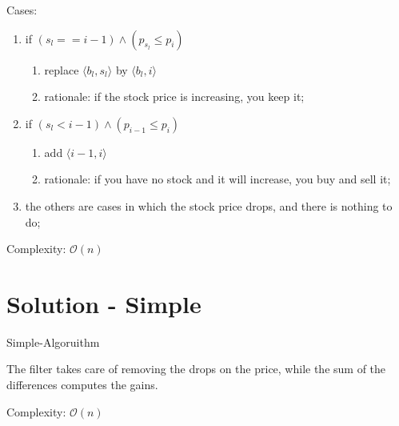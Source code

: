 Cases:

\begin{enumerate}
    \item if $(s_l == i-1) \land (p_{s_l} \leqslant p_i)$
    \begin{enumerate}
        \item replace $\langle b_l, s_l \rangle$ by $\langle b_l, i \rangle$
        \item rationale: if the stock price is increasing, you keep it;
    \end{enumerate}
    \item if $(s_l < i-1) \land (p_{i-1} \leqslant p_i)$
    \begin{enumerate}
        \item add $\langle i-1, i \rangle$
        \item rationale: if you have no stock and it will increase, you buy and sell it;
    \end{enumerate}
    \item the others are cases in which the stock price drops, and there is nothing to do;
\end{enumerate}

Complexity: $\mathcal{O}(n)$

\section{Solution - Simple}

\begin{algorithm}[H]
    \caption{Simple-Algoruithm}
    \label{algo:ga}
    \begin{algorithmic}[1]
    \end{algorithmic}
\end{algorithm}

The filter takes care of removing the drops on the price, while the sum of the differences computes the gains.

Complexity: $\mathcal{O}(n)$
